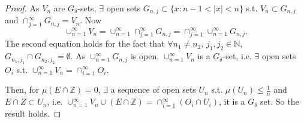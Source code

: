 \documentclass{article}
\newcommand{\cp}[2]{\cup_{#1=1}^{#2}}
\begin{document}
\begin{proof}
    As $V_{n}$ are $G_{\delta}$-sets, 
    $\exists$ open sets $G_{n,j}\subset\{x:n-1<|x|<n\}$ s.t. 
    $V_{n}\subset G_{n,j}$ and 
    $\cap_{j=1}^{\infty}G_{n,j}=V_{n}$. 
    Now 
    \begin{displaymath}
        \cp{n}{\infty}V_{n}=\cp{n}{\infty}\cap_{j=1}^{\infty}G_{n,j}
        =\cap_{j=1}^{\infty}\cp{n}{\infty}G_{n,j}.
    \end{displaymath}
    The second equation holds for the fact that $\forall n_{1}\neq n_{2}$, 
    $j_{1},j_{2}\in\mathbb{N}$, 
    $G_{n_{1},j_{1}}\cap G_{n_2,j_2}=\emptyset$.
    As $\cp{n}{\infty}G_{n,j}$ is open, $\cp{n}{\infty}V_{n}$ is a 
    $G_{\delta}$-set,
    i.e. $\exists$ open sets $O_{i}$ 
    s.t. $\cp{n}{\infty}V_{n}=\cap_{i=1}^{\infty}O_{i}$.

    Then, for $\mu(E\cap \mathbb{Z})=0$, 
    $\exists$ a sequence of open sets $U_{n}$ s.t. 
    $\mu(U_{n})\le\frac{1}{n}$ and $E\cap Z\subset U_{n}$, i.e. 
    $\cp{n}{\infty}V_{n}\cup(E\cap \mathbb{Z})
    =\cap_{i=1}^{\infty}(O_{i}\cap U_{i})$, it is a $G_{\delta}$ 
    set. 
    So the result holds.
\end{proof}
\end{document}
